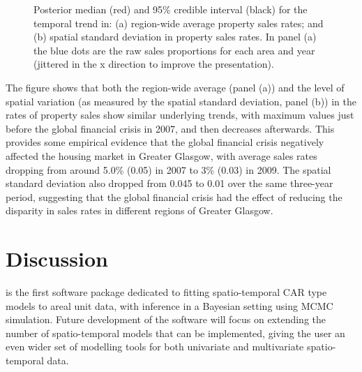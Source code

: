 \documentclass[article, nojss]{jss}
\begin{document}
\begin{figure}
\centering 
{}
\caption{Posterior median (red) and 95\% credible interval (black) for the temporal trend in: (a) region-wide average property sales rates; and (b) spatial standard deviation in property sales rates. In panel (a) the blue dots are the raw sales proportions for each area and year (jittered in the x direction to improve the presentation).\label{salestrend}}
\end{figure} 

The figure shows that both the region-wide average (panel (a)) and the level of spatial variation (as measured by the spatial standard deviation, panel (b)) in the rates of property sales show similar underlying trends, with maximum values just before the global financial crisis in 2007, and then  decreases afterwards. This provides some empirical evidence that the global financial crisis negatively affected the housing market in Greater Glasgow, with average sales rates dropping from around 5.0\% (0.05) in 2007 to 3\% (0.03) in 2009. The spatial standard deviation also dropped from 0.045 to 0.01 over the same three-year period, suggesting that the global financial crisis had the effect of reducing the disparity in sales rates in different regions of Greater Glasgow.




\section{Discussion}\label{section7}
 is the first software package dedicated to fitting spatio-temporal CAR type models to areal unit data, with inference in a Bayesian setting using MCMC simulation. Future development of the software will focus on extending the number of spatio-temporal models that can be implemented, giving the user an even wider set of modelling tools for both univariate and multivariate spatio-temporal data. 
\end{document}
